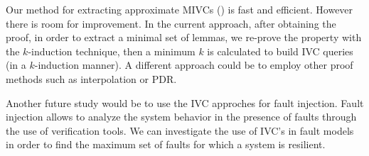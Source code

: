 Our method for extracting approximate MIVCs (\ucalg) is fast and efficient. However there is room for improvement. In the current approach, after obtaining the proof, in order to extract a minimal set of lemmas, we re-prove the property with the $k$-induction technique, then a minimum $k$ is calculated to build IVC queries (in a $k$-induction manner). A different approach could be to employ other proof methods such as interpolation or PDR.

Another future study would be to use the IVC approches for fault injection. Fault injection allows to analyze the system behavior in the presence of faults through the use of verification tools. We can investigate the use of IVC's in fault models in order to find the maximum set of faults for which a system is resilient.

